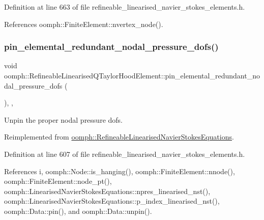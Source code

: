 Definition at line 663 of file refineable\+\_\+linearised\+\_\+navier\+\_\+stokes\+\_\+elements.\+h.



References oomph\+::\+Finite\+Element\+::nvertex\+\_\+node().

\mbox{\label{classoomph_1_1RefineableLinearisedQTaylorHoodElement_a9f9e9989fcfca1fba2b5ba1778897b4a}} 
\subsubsection{\texorpdfstring{pin\+\_\+elemental\+\_\+redundant\+\_\+nodal\+\_\+pressure\+\_\+dofs()}{pin\_elemental\_redundant\_nodal\_pressure\_dofs()}}
{\footnotesize\ttfamily void oomph\+::\+Refineable\+Linearised\+Q\+Taylor\+Hood\+Element\+::pin\+\_\+elemental\+\_\+redundant\+\_\+nodal\+\_\+pressure\+\_\+dofs (\begin{DoxyParamCaption}{ }\end{DoxyParamCaption})\hspace{0.3cm}{\ttfamily [inline]}, {\ttfamily [private]}, {\ttfamily [virtual]}}



Unpin the proper nodal pressure dofs. 



Reimplemented from \hyperlink{classoomph_1_1RefineableLinearisedNavierStokesEquations_ab75b06f5beca6c7ce405a9e91a15c708}{oomph\+::\+Refineable\+Linearised\+Navier\+Stokes\+Equations}.



Definition at line 607 of file refineable\+\_\+linearised\+\_\+navier\+\_\+stokes\+\_\+elements.\+h.



References i, oomph\+::\+Node\+::is\+\_\+hanging(), oomph\+::\+Finite\+Element\+::nnode(), oomph\+::\+Finite\+Element\+::node\+\_\+pt(), oomph\+::\+Linearised\+Navier\+Stokes\+Equations\+::npres\+\_\+linearised\+\_\+nst(), oomph\+::\+Linearised\+Navier\+Stokes\+Equations\+::p\+\_\+index\+\_\+linearised\+\_\+nst(), oomph\+::\+Data\+::pin(), and oomph\+::\+Data\+::unpin().

